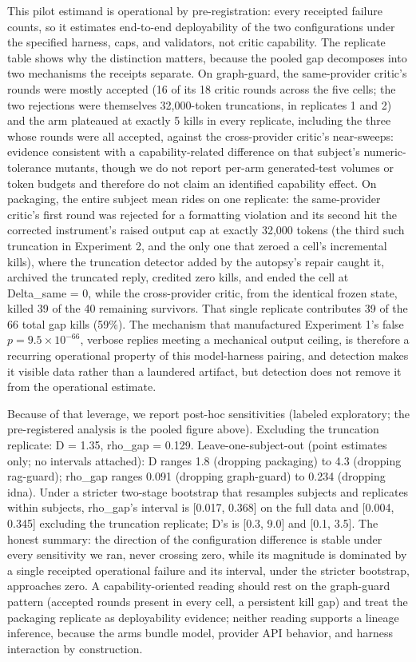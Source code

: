 \documentclass[
  11pt,
]{article}
\begin{document}
This pilot estimand is operational by pre-registration: every receipted
failure counts, so it estimates end-to-end deployability of the two
configurations under the specified harness, caps, and validators, not
critic capability. The replicate table shows why the distinction
matters, because the pooled gap decomposes into two mechanisms the
receipts separate. On graph-guard, the same-provider critic's rounds
were mostly accepted (16 of its 18 critic rounds across the five cells;
the two rejections were themselves 32,000-token truncations, in
replicates 1 and 2) and the arm plateaued at exactly 5 kills in every
replicate, including the three whose rounds were all accepted, against
the cross-provider critic's near-sweeps: evidence consistent with a
capability-related difference on that subject's numeric-tolerance
mutants, though we do not report per-arm generated-test volumes or token
budgets and therefore do not claim an identified capability effect. On
packaging, the entire subject mean rides on one replicate: the
same-provider critic's first round was rejected for a formatting
violation and its second hit the corrected instrument's raised output
cap at exactly 32,000 tokens (the third such truncation in Experiment 2,
and the only one that zeroed a cell's incremental kills), where the
truncation detector added by the autopsy's repair caught it, archived
the truncated reply, credited zero kills, and ended the cell at
Delta\_same = 0, while the cross-provider critic, from the identical
frozen state, killed 39 of the 40 remaining survivors. That single
replicate contributes 39 of the 66 total gap kills (59\%). The mechanism
that manufactured Experiment 1's false $p = 9.5 \times 10^{-66}$, verbose
replies meeting a mechanical output ceiling, is therefore a recurring
operational property of this model-harness pairing, and detection makes
it visible data rather than a laundered artifact, but detection does not
remove it from the operational estimate.

Because of that leverage, we report post-hoc sensitivities (labeled
exploratory; the pre-registered analysis is the pooled figure above).
Excluding the truncation replicate: D = 1.35, rho\_gap = 0.129.
Leave-one-subject-out (point estimates only; no intervals attached): D
ranges 1.8 (dropping packaging) to 4.3 (dropping rag-guard); rho\_gap
ranges 0.091 (dropping graph-guard) to 0.234 (dropping idna). Under a
stricter two-stage bootstrap that resamples subjects and replicates
within subjects, rho\_gap's interval is {[}0.017, 0.368{]} on the full
data and {[}0.004, 0.345{]} excluding the truncation replicate; D's is
{[}0.3, 9.0{]} and {[}0.1, 3.5{]}. The honest summary: the direction of
the configuration difference is stable under every sensitivity we ran,
never crossing zero, while its magnitude is dominated by a single
receipted operational failure and its interval, under the stricter
bootstrap, approaches zero. A capability-oriented reading should rest on
the graph-guard pattern (accepted rounds present in every cell, a
persistent kill gap) and treat the packaging replicate as deployability
evidence; neither reading supports a lineage inference, because the arms
bundle model, provider API behavior, and harness interaction by
construction.
\end{document}

